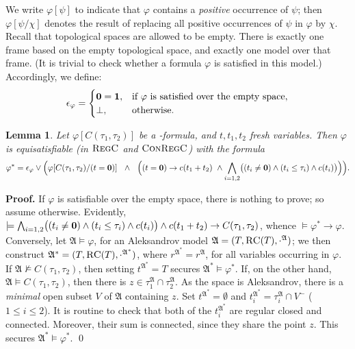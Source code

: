 \documentclass{LMCS}
\renewenvironment{proof}{\par\noindent\textbf{Proof.}}{\mbox{}\qed\par\medskip}
\theoremstyle{plain}
\newtheorem{lemma}[thm]{Lemma}
\newcommand{\fA}{\mathfrak{A}}\newcommand{\fB}{\mathfrak{B}}\newcommand{\fM}{\mathfrak{M}}\newcommand{\cK}{\mathcal{K}}\newcommand{\R}{\mathbb{R}}\newcommand{\cR}{\mathcal{R}}\newcommand{\cL}{\mathcal{L}}\newcommand{\cLc}{\mathcal{L}c}\newcommand{\cLcc}{\mathcal{L}cc}
\newcommand{\Regc}{\textsc{RegC}}
\newcommand{\ConR}{\textsc{ConRegC}}
\begin{document}
We write $\varphi[\psi]$ to indicate that
$\varphi$ contains a \emph{positive} occurrence of
$\psi$; then $\varphi[\psi/\chi]$ denotes the
result of replacing all positive occurrences of $\psi$ in $\varphi$ by $\chi$.
Recall that topological spaces are allowed to be empty.
There is exactly one frame based on the
empty topological space, and exactly one model over that frame.
(It is trivial to check whether a formula $\varphi$ is satisfied in this model.)
Accordingly, we define:
\begin{equation*}
\epsilon_\varphi =
\begin{cases}
\mathbf{0} = \mathbf{1}, & \text{if $\varphi$ is satisfied over the empty space},\\
\bot, & \text{otherwise.}
\end{cases}
\end{equation*}
\begin{lemma}\label{lma:poss2}
Let $\varphi[C(\tau_1,\tau_2)]$ be a
\cBCcc-formula, and $t, t_1, t_2$ fresh variables. Then $\varphi$ is equisatisfiable \textup{(}in $\Regc$ and $\ConR$\textup{)} with the formula
\begin{equation*}
\varphi^*  =  \epsilon_\varphi \vee
\Bigl(
\varphi[C(\tau_1,\tau_2)/(t = \mathbf{0})] \ \ \wedge\ \
   \Bigl((t = \mathbf{0})  \rightarrow
  c(t_1 + t_2) \ \land \bigwedge_{i = 1,2} \bigl((t_i \ne\mathbf{0}) \land (t_i \leq \tau_i) \land c(t_i)\bigr) \Bigr) \Bigr) .
\end{equation*}
\end{lemma}
\begin{proof}
If $\varphi$ is satisfiable over the empty space, there is nothing to
prove; so assume otherwise.  Evidently, $\models \bigwedge_{i = 1,2}
\bigl((t_i \ne\mathbf{0}) \land (t_i \leq \tau_i) \land c(t_i) \bigr)
\wedge c(t_1 + t_2) \rightarrow C(\tau_1,\tau_2)$, whence $\models
\varphi^* \rightarrow \varphi$. Conversely, let $\fA \models \varphi$,
for an Aleksandrov model $\mathfrak{A} =
(T,\textsc{RC}(T),\cdot^\mathfrak{A})$; we then construct $\fA^* =
(T,\RegC(T),\cdot^{\mathfrak{A}^*})$, where $r^{\mathfrak{A}^*} =
r^\mathfrak{A}$, for all variables occurring in $\varphi$. If $\fA
\not \models C(\tau_1,\tau_2)$, then setting $t^{\fA^*} = T$ secures
$\fA^* \models \varphi^*$. If, on the other hand, $\fA \models
C(\tau_1,\tau_2)$, then there is $z \in \tau_1^\mathfrak{A} \cap
\tau_2^\mathfrak{A}$.  As the space is Aleksandrov, there is a
\emph{minimal} open subset $V$ of $\fA$ containing $z$.  Set
$t^{\fA^*} = \emptyset$ and $t_i^{\fA^*} = \tau_i^\fA \cap V^-$ ($1
\leq i \leq 2$).  It is routine to check that both of the
$t_i^{\fA^*}$ are regular closed and connected. Moreover, their sum is
connected, since they share the point $z$. This secures $\fA^* \models
\varphi^*$.
\end{proof}
\end{document}

